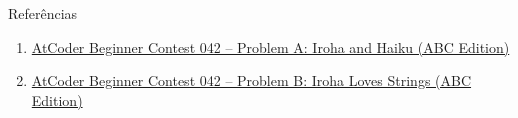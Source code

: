 \begin{frame}[fragile]{Referências}

    \begin{enumerate}
        \item \href{https://atcoder.jp/contests/abc042/tasks/abc042_a}{AtCoder Beginner Contest
            042 -- Problem A: Iroha and Haiku (ABC Edition)} 

        \item \href{https://atcoder.jp/contests/abc042/tasks/abc042_b}{AtCoder Beginner Contest
            042 -- Problem B: Iroha Loves Strings (ABC Edition)} 
    \end{enumerate}

\end{frame}
